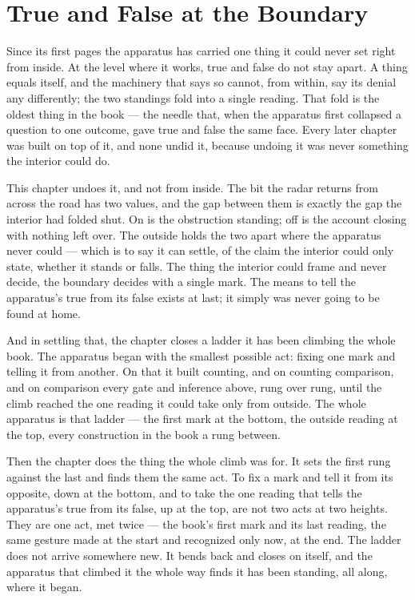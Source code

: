 \chapter{True and False at the Boundary}

Since its first pages the apparatus has carried one thing it could never set right from inside. At the level where it works, true and false do not stay apart. A thing equals itself, and the machinery that says so cannot, from within, say its denial any differently; the two standings fold into a single reading. That fold is the oldest thing in the book --- the needle that, when the apparatus first collapsed a question to one outcome, gave true and false the same face. Every later chapter was built on top of it, and none undid it, because undoing it was never something the interior could do.

This chapter undoes it, and not from inside. The bit the radar returns from across the road has two values, and the gap between them is exactly the gap the interior had folded shut. On is the obstruction standing; off is the account closing with nothing left over. The outside holds the two apart where the apparatus never could --- which is to say it can settle, of the claim the interior could only state, whether it stands or falls. The thing the interior could frame and never decide, the boundary decides with a single mark. The means to tell the apparatus's true from its false exists at last; it simply was never going to be found at home.

And in settling that, the chapter closes a ladder it has been climbing the whole book. The apparatus began with the smallest possible act: fixing one mark and telling it from another. On that it built counting, and on counting comparison, and on comparison every gate and inference above, rung over rung, until the climb reached the one reading it could take only from outside. The whole apparatus is that ladder --- the first mark at the bottom, the outside reading at the top, every construction in the book a rung between.

Then the chapter does the thing the whole climb was for. It sets the first rung against the last and finds them the same act. To fix a mark and tell it from its opposite, down at the bottom, and to take the one reading that tells the apparatus's true from its false, up at the top, are not two acts at two heights. They are one act, met twice --- the book's first mark and its last reading, the same gesture made at the start and recognized only now, at the end. The ladder does not arrive somewhere new. It bends back and closes on itself, and the apparatus that climbed it the whole way finds it has been standing, all along, where it began.

